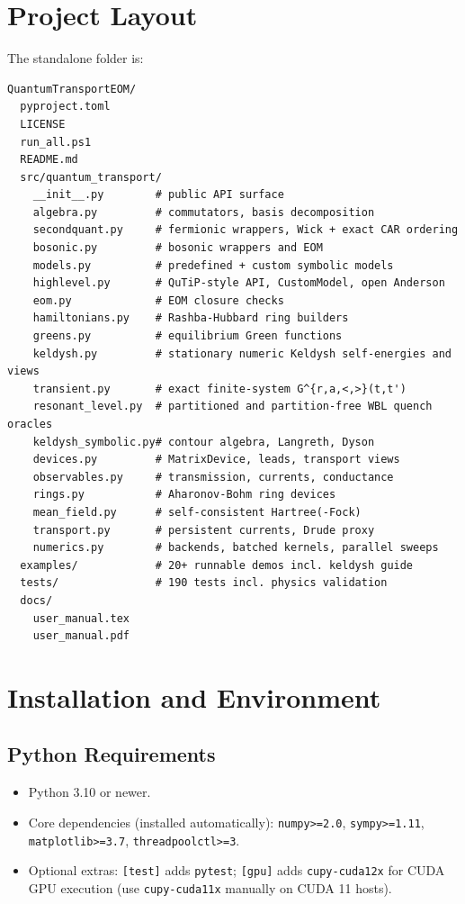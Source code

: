 \documentclass[11pt,a4paper]{article}
\begin{document}
\section{Project Layout}
The standalone folder is:
\begin{lstlisting}[style=ps]
QuantumTransportEOM/
  pyproject.toml
  LICENSE
  run_all.ps1
  README.md
  src/quantum_transport/
    __init__.py        # public API surface
    algebra.py         # commutators, basis decomposition
    secondquant.py     # fermionic wrappers, Wick + exact CAR ordering
    bosonic.py         # bosonic wrappers and EOM
    models.py          # predefined + custom symbolic models
    highlevel.py       # QuTiP-style API, CustomModel, open Anderson
    eom.py             # EOM closure checks
    hamiltonians.py    # Rashba-Hubbard ring builders
    greens.py          # equilibrium Green functions
    keldysh.py         # stationary numeric Keldysh self-energies and views
    transient.py       # exact finite-system G^{r,a,<,>}(t,t')
    resonant_level.py  # partitioned and partition-free WBL quench oracles
    keldysh_symbolic.py# contour algebra, Langreth, Dyson
    devices.py         # MatrixDevice, leads, transport views
    observables.py     # transmission, currents, conductance
    rings.py           # Aharonov-Bohm ring devices
    mean_field.py      # self-consistent Hartree(-Fock)
    transport.py       # persistent currents, Drude proxy
    numerics.py        # backends, batched kernels, parallel sweeps
  examples/            # 20+ runnable demos incl. keldysh guide
  tests/               # 190 tests incl. physics validation
  docs/
    user_manual.tex
    user_manual.pdf
\end{lstlisting}

\section{Installation and Environment}
\subsection{Python Requirements}
\begin{itemize}[leftmargin=1.5em]
  \item Python 3.10 or newer.
  \item Core dependencies (installed automatically): \texttt{numpy>=2.0}, \texttt{sympy>=1.11}, \texttt{matplotlib>=3.7}, \texttt{threadpoolctl>=3}.
  \item Optional extras: \texttt{[test]} adds \texttt{pytest}; \texttt{[gpu]} adds \texttt{cupy-cuda12x} for CUDA GPU execution (use \texttt{cupy-cuda11x} manually on CUDA 11 hosts).
\end{itemize}
\end{document}
